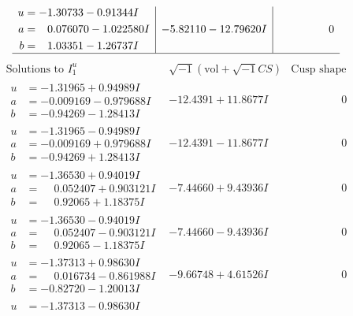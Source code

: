 \documentclass[1p]{elsarticle_modified}
\theoremstyle{definition}
\newcommand{\I}{\sqrt{-1}}
\begin{document}
$$\begin{array}{c|c|c}
\begin{aligned}
u &= -1.30733 - 0.91344 I \\
a &= \phantom{-}0.076070 - 1.022580 I \\
b &= \phantom{-}1.03351 - 1.26737 I\end{aligned}
 & -5.82110 - 12.79620 I & \phantom{-0.000000 } 0\\
 \hline 
 \end{array}$$\newpage$$\begin{array}{c|c|c}  
\text{Solutions to }I^u_{1}& \I (\text{vol} + \sqrt{-1}CS) & \text{Cusp shape}\\
 \hline 
\begin{aligned}
u &= -1.31965 + 0.94989 I \\
a &= -0.009169 - 0.979688 I \\
b &= -0.94269 - 1.28413 I\end{aligned}
 & -12.4391 + 11.8677 I & \phantom{-0.000000 } 0 \\ \hline\begin{aligned}
u &= -1.31965 - 0.94989 I \\
a &= -0.009169 + 0.979688 I \\
b &= -0.94269 + 1.28413 I\end{aligned}
 & -12.4391 - 11.8677 I & \phantom{-0.000000 } 0 \\ \hline\begin{aligned}
u &= -1.36530 + 0.94019 I \\
a &= \phantom{-}0.052407 + 0.903121 I \\
b &= \phantom{-}0.92065 + 1.18375 I\end{aligned}
 & -7.44660 + 9.43936 I & \phantom{-0.000000 } 0 \\ \hline\begin{aligned}
u &= -1.36530 - 0.94019 I \\
a &= \phantom{-}0.052407 - 0.903121 I \\
b &= \phantom{-}0.92065 - 1.18375 I\end{aligned}
 & -7.44660 - 9.43936 I & \phantom{-0.000000 } 0 \\ \hline\begin{aligned}
u &= -1.37313 + 0.98630 I \\
a &= \phantom{-}0.016734 - 0.861988 I \\
b &= -0.82720 - 1.20013 I\end{aligned}
 & -9.66748 + 4.61526 I & \phantom{-0.000000 } 0 \\ \hline\begin{aligned}
u &= -1.37313 - 0.98630 I \\

\end{aligned}
\end{array}$$
\end{document}
